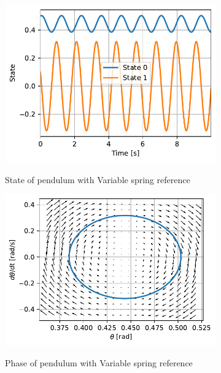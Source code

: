 \documentclass{cmc}
\begin{document}
\begin{figure}[H]
  \centering
  \begin{subfigure}[b]{0.49\textwidth}
    { \centering
      \includegraphics[width=\textwidth]{figures/State_Variable_Spring_Reference_1(x0_=_[0dot5,_0dot1]).pdf}
    }
    \caption{State of pendulum with Variable spring reference}
    \label{fig:state-pendulum-variable-spring-reference-1}
  \end{subfigure}
  \begin{subfigure}[b]{0.49\textwidth}
    { \centering
      \includegraphics[width=\textwidth]{figures/Phase_Variable_Spring_Reference_1(x0_=_[0dot5,_0dot1]).pdf}
    }
    \caption{Phase of pendulum with Variable spring reference}
    \label{fig:phase-pendulum-variable-spring-reference-1}
  \end{subfigure}
  \caption{}
  \label{fig:pendulum-variable-spring-reference-1}
\end{figure}
\end{document}
